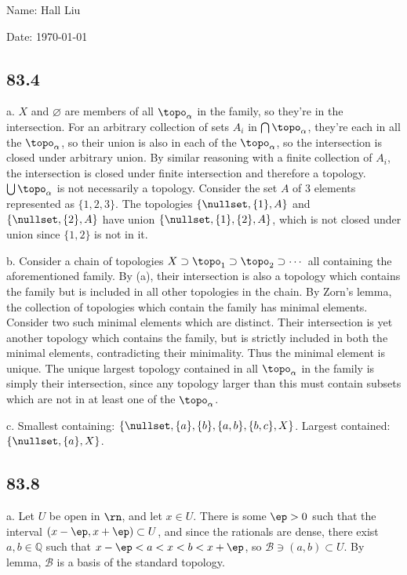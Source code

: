 \documentclass{article}
\begin{document}
Name: Hall Liu

Date: \today 
\vspace{1.5cm}

\subsection*{83.4}
a. $X$ and $\varnothing$ are members of all $\topo_\alpha$ in the family, so they're in the intersection. For an arbitrary collection of sets $A_i$ in $\bigcap\topo_\alpha$, they're each in all the $\topo_\alpha$, so their union is also in each of the $\topo_\alpha$, so the intersection is closed under arbitrary union. By similar reasoning with a finite collection of $A_i$, the intersection is closed under finite intersection and therefore a topology. $\bigcup\topo_\alpha$ is not necessarily a topology. Consider the set $A$ of $3$ elements represented as $\{1,2,3\}$. The topologies $\{\nullset,\{1\},A\}$ and $\{\nullset,\{2\},A\}$ have union $\{\nullset,\{1\},\{2\},A\}$, which is not closed under union since $\{1,2\}$ is not in it.

b. Consider a chain of topologies $X\supset\topo_1\supset\topo_2\supset\cdots$ all containing the aforementioned family. By (a), their intersection is also a topology which contains the family but is included in all other topologies in the chain. By Zorn's lemma, the collection of topologies which contain the family has minimal elements. Consider two such minimal elements which are distinct. Their intersection is yet another topology which contains the family, but is strictly included in both the minimal elements, contradicting their minimality. Thus the minimal element is unique. The unique largest topology contained in all $\topo_\alpha$ in the family is simply their intersection, since any topology larger than this must contain subsets which are not in at least one of the $\topo_\alpha$.

c. Smallest containing: $\{\nullset,\{a\},\{b\},\{a,b\},\{b,c\},X\}$. Largest contained: $\{\nullset,\{a\},X\}$.
\subsection*{83.8}
a. Let $U$ be open in $\rn$, and let $x\in U$. There is some $\ep>0$ such that the interval $(x-\ep,x+\ep)\subset U$, and since the rationals are dense, there exist $a,b\in\mathbb{Q}$ such that $x-\ep<a<x<b<x+\ep$, so $\mathscr{B}\ni(a,b)\subset U$. By lemma, $\mathscr{B}$ is a basis of the standard topology.
\end{document}
